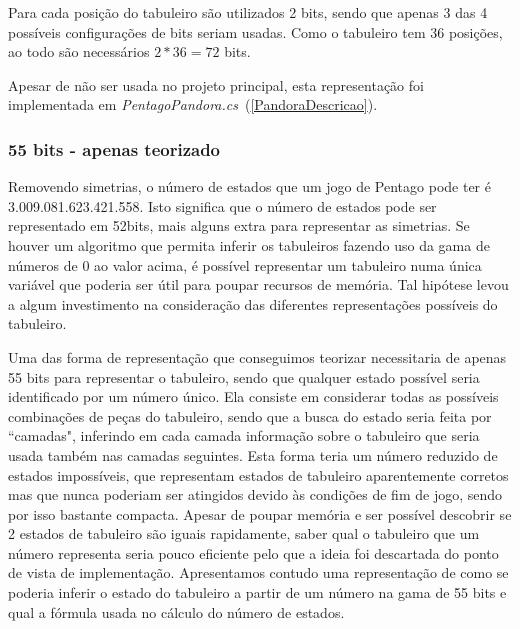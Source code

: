 Para cada posição do tabuleiro são utilizados 2 bits, sendo que apenas 3 das 4 possíveis configurações de bits seriam usadas. Como o tabuleiro tem 36 posições, ao todo são necessários $2 * 36 = 72$ bits.

Apesar de não ser usada no projeto principal, esta representação foi implementada em \emph{PentagoPandora.cs}~(\ref{PandoraDescricao}).

\subsubsection{55 bits - apenas teorizado}

Removendo simetrias, o número de estados que um jogo de Pentago pode ter é 3.009.081.623.421.558. Isto significa que o número de estados pode ser representado em 52bits, mais alguns extra para representar as simetrias. Se houver um algoritmo que permita inferir os tabuleiros fazendo uso da gama de números de 0 ao valor acima, é possível representar um tabuleiro numa única variável que poderia ser útil para poupar recursos de memória. Tal hipótese levou a algum investimento na consideração das diferentes representações possíveis do tabuleiro.

Uma das forma de representação que conseguimos teorizar necessitaria de apenas 55 bits para representar o tabuleiro, sendo que qualquer estado possível seria identificado por um número único. Ela consiste em considerar todas as possíveis combinações de peças do tabuleiro, sendo que a busca do estado seria feita por ``camadas", inferindo em cada camada informação sobre o tabuleiro que seria usada também nas camadas seguintes. Esta forma teria um número reduzido de estados impossíveis, que representam estados de tabuleiro aparentemente corretos mas que nunca poderiam ser atingidos devido às condições de fim de jogo, sendo por isso bastante compacta. Apesar de poupar memória e ser possível descobrir se 2 estados de tabuleiro são iguais rapidamente, saber qual o tabuleiro que um número representa seria pouco eficiente pelo que a ideia foi descartada do ponto de vista de implementação. Apresentamos contudo uma representação de como se poderia inferir o estado do tabuleiro a partir de um número na gama de 55 bits e qual a fórmula usada no cálculo do número de estados.

